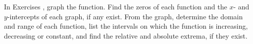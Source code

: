 {\noindent In Exercises}
{, graph the function. Find the zeros of each function and the $x$- and $y$-intercepts of each graph, if any exist.  From the graph, determine the domain and range of each function, list the intervals on which the function is increasing, decreasing or constant, and find the relative and absolute extrema, if they exist.}
